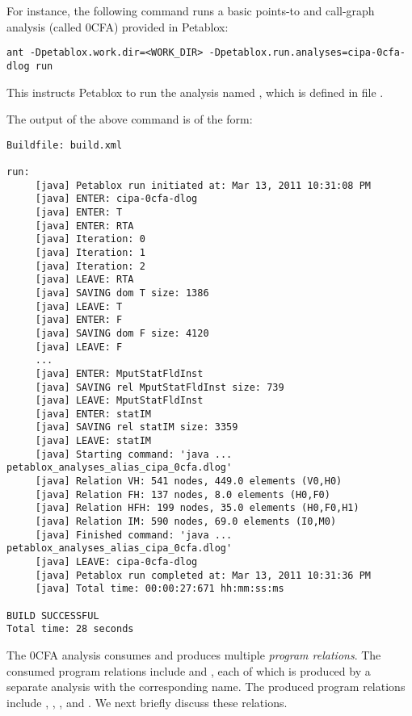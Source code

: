 For instance, the following command runs a basic points-to and call-graph
analysis (called 0CFA) provided in Petablox:

\begin{framed}
\begin{verbatim}
ant -Dpetablox.work.dir=<WORK_DIR> -Dpetablox.run.analyses=cipa-0cfa-dlog run
\end{verbatim}
\end{framed}

This instructs Petablox to run the analysis named ,
which is defined in file .

The output of the above command is of the form:

\begin{framed}
{\small
\begin{verbatim}
Buildfile: build.xml

run:
     [java] Petablox run initiated at: Mar 13, 2011 10:31:08 PM
     [java] ENTER: cipa-0cfa-dlog
     [java] ENTER: T
     [java] ENTER: RTA
     [java] Iteration: 0
     [java] Iteration: 1
     [java] Iteration: 2
     [java] LEAVE: RTA
     [java] SAVING dom T size: 1386
     [java] LEAVE: T
     [java] ENTER: F
     [java] SAVING dom F size: 4120
     [java] LEAVE: F
     ...
     [java] ENTER: MputStatFldInst
     [java] SAVING rel MputStatFldInst size: 739
     [java] LEAVE: MputStatFldInst
     [java] ENTER: statIM
     [java] SAVING rel statIM size: 3359
     [java] LEAVE: statIM
     [java] Starting command: 'java ... petablox_analyses_alias_cipa_0cfa.dlog'
     [java] Relation VH: 541 nodes, 449.0 elements (V0,H0)
     [java] Relation FH: 137 nodes, 8.0 elements (H0,F0)
     [java] Relation HFH: 199 nodes, 35.0 elements (H0,F0,H1)
     [java] Relation IM: 590 nodes, 69.0 elements (I0,M0)
     [java] Finished command: 'java ... petablox_analyses_alias_cipa_0cfa.dlog'
     [java] LEAVE: cipa-0cfa-dlog
     [java] Petablox run completed at: Mar 13, 2011 10:31:36 PM
     [java] Total time: 00:00:27:671 hh:mm:ss:ms

BUILD SUCCESSFUL
Total time: 28 seconds
\end{verbatim}
}
\end{framed}

The 0CFA analysis consumes and produces multiple {\it program relations}.  The
consumed program relations include  and ,
each of which is produced by a separate analysis with the corresponding name.
The produced program relations include , , , and
.  We next briefly discuss these relations.

